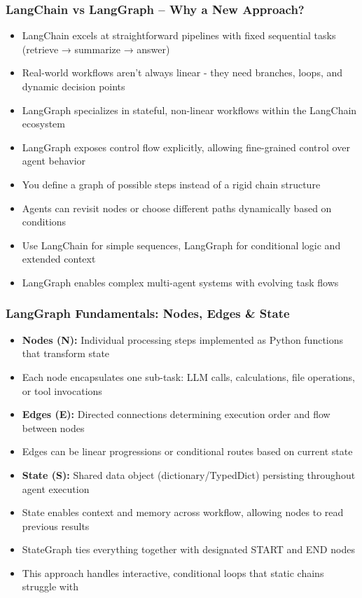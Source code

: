 \begin{frame}[fragile]\frametitle{LangChain vs LangGraph – Why a New Approach?}

      \begin{itemize}
        \item LangChain excels at straightforward pipelines with fixed sequential tasks (retrieve → summarize → answer)
        \item Real-world workflows aren't always linear - they need branches, loops, and dynamic decision points
        \item LangGraph specializes in stateful, non-linear workflows within the LangChain ecosystem
        \item LangGraph exposes control flow explicitly, allowing fine-grained control over agent behavior
        \item You define a graph of possible steps instead of a rigid chain structure
        \item Agents can revisit nodes or choose different paths dynamically based on conditions
        \item Use LangChain for simple sequences, LangGraph for conditional logic and extended context
        \item LangGraph enables complex multi-agent systems with evolving task flows
      \end{itemize}

\end{frame}

\begin{frame}[fragile]\frametitle{LangGraph Fundamentals: Nodes, Edges \& State}

      \begin{itemize}
        \item \textbf{Nodes (N):} Individual processing steps implemented as Python functions that transform state
        \item Each node encapsulates one sub-task: LLM calls, calculations, file operations, or tool invocations
        \item \textbf{Edges (E):} Directed connections determining execution order and flow between nodes
        \item Edges can be linear progressions or conditional routes based on current state
        \item \textbf{State (S):} Shared data object (dictionary/TypedDict) persisting throughout agent execution
        \item State enables context and memory across workflow, allowing nodes to read previous results
        \item StateGraph ties everything together with designated START and END nodes
        \item This approach handles interactive, conditional loops that static chains struggle with
      \end{itemize}
  

\end{frame}

